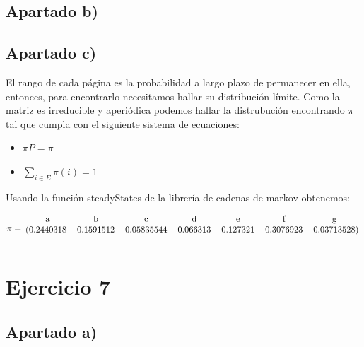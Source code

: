\documentclass[11pt]{article}
\begin{document}
\subsection*{Apartado b)}


\subsection*{Apartado c)}

El rango de cada página es la probabilidad a largo plazo de permanecer en ella,
entonces, para encontrarlo necesitamos hallar su distribución límite. Como la matriz
es irreducible y aperiódica podemos hallar la distrubución encontrando
$\pi$ tal que cumpla con el siguiente sistema de ecuaciones:

\begin{itemize}
  \item $\pi P = \pi$
  \item $\displaystyle\sum_{i \in E} \pi(i) = 1$
\end{itemize}

Usando la función steadyStates de la librería de cadenas de markov obtenemos:

\begin{equation*}
  \pi = 
  \begin{blockarray}{ccccccc}
    \text{a} & \text{b} & \text{c} & \text{d} & \text{e} & \text{f} & \text{g} \\
    \begin{block}{(ccccccc)}
      0.2440318 & 0.1591512 & 0.05835544 & 0.066313 & 0.127321 & 0.3076923 & 0.03713528 \\
    \end{block}
  \end{blockarray}
\end{equation*}


\section{Ejercicio 7}

\subsection*{Apartado a)}
\end{document}

